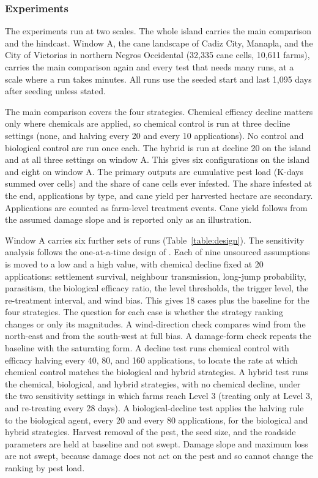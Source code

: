 \subsubsection{Experiments}

The experiments run at two scales. The whole island carries the main comparison and the hindcast. Window A, the cane landscape of Cadiz City, Manapla, and the City of Victorias in northern Negros Occidental (32,335 cane cells, 10,611 farms), carries the main comparison again and every test that needs many runs, at a scale where a run takes minutes. All runs use the seeded start and last 1,095 days after seeding unless stated.

The main comparison covers the four strategies. Chemical efficacy decline matters only where chemicals are applied, so chemical control is run at three decline settings (none, and halving every 20 and every 10 applications). No control and biological control are run once each. The hybrid is run at decline 20 on the island and at all three settings on window A. This gives six configurations on the island and eight on window A. The primary outputs are cumulative pest load (K-days summed over cells) and the share of cane cells ever infested. The share infested at the end, applications by type, and cane yield per harvested hectare are secondary. Applications are counted as farm-level treatment events. Cane yield follows from the assumed damage slope and is reported only as an illustration.

Window A carries six further sets of runs (Table~\ref{table:design}). The sensitivity analysis follows the one-at-a-time design of \citet{Alves2026}. Each of nine unsourced assumptions is moved to a low and a high value, with chemical decline fixed at 20 applications: settlement survival, neighbour transmission, long-jump probability, parasitism, the biological efficacy ratio, the level thresholds, the trigger level, the re-treatment interval, and wind bias. This gives 18 cases plus the baseline for the four strategies. The question for each case is whether the strategy ranking changes or only its magnitudes. A wind-direction check compares wind from the north-east and from the south-west at full bias. A damage-form check repeats the baseline with the saturating form. A decline test runs chemical control with efficacy halving every 40, 80, and 160 applications, to locate the rate at which chemical control matches the biological and hybrid strategies. A hybrid test runs the chemical, biological, and hybrid strategies, with no chemical decline, under the two sensitivity settings in which farms reach Level 3 (treating only at Level 3, and re-treating every 28 days). A biological-decline test applies the halving rule to the biological agent, every 20 and every 80 applications, for the biological and hybrid strategies. Harvest removal of the pest, the seed size, and the roadside parameters are held at baseline and not swept. Damage slope and maximum loss are not swept, because damage does not act on the pest and so cannot change the ranking by pest load.

